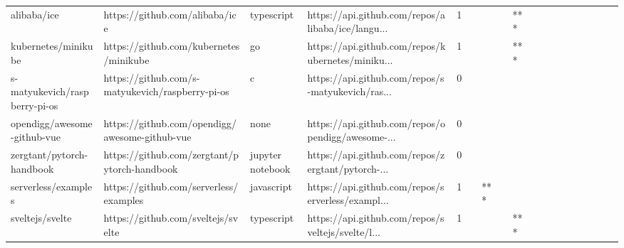 \begin{tabular}{llllrlllllllllllll}
alibaba/ice                                        &                     https://github.com/alibaba/ice &        typescript &  https://api.github.com/repos/alibaba/ice/langu... &       1 &         &        &           &            *** &                 &        &           &           &          &          &       &              &          \\
kubernetes/minikube                                &             https://github.com/kubernetes/minikube &                go &  https://api.github.com/repos/kubernetes/miniku... &       1 &         &        &           &            *** &                 &        &           &           &          &          &       &              &          \\
s-matyukevich/raspberry-pi-os                      &   https://github.com/s-matyukevich/raspberry-pi-os &                 c &  https://api.github.com/repos/s-matyukevich/ras... &       0 &         &        &           &                &                 &        &           &           &          &          &       &              &          \\
opendigg/awesome-github-vue                        &     https://github.com/opendigg/awesome-github-vue &              none &  https://api.github.com/repos/opendigg/awesome-... &       0 &         &        &           &                &                 &        &           &           &          &          &       &              &          \\
zergtant/pytorch-handbook                          &       https://github.com/zergtant/pytorch-handbook &  jupyter notebook &  https://api.github.com/repos/zergtant/pytorch-... &       0 &         &        &           &                &                 &        &           &           &          &          &       &              &          \\
serverless/examples                                &             https://github.com/serverless/examples &        javascript &  https://api.github.com/repos/serverless/exampl... &       1 &         &    *** &           &                &                 &        &           &           &          &          &       &              &          \\
sveltejs/svelte                                    &                 https://github.com/sveltejs/svelte &        typescript &  https://api.github.com/repos/sveltejs/svelte/l... &       1 &         &        &           &            *** &                 &        &           &           &          &          &       &              &          \\

\end{tabular}
